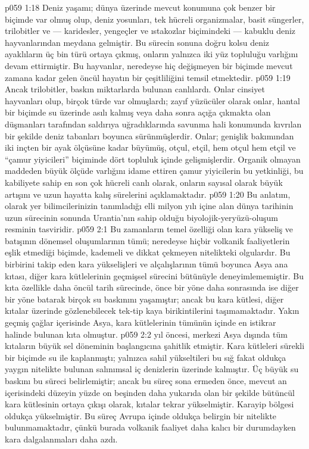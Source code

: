 \vs p059 1:18 Deniz yaşamı; dünya üzerinde mevcut konumuna çok benzer bir biçimde var olmuş olup, deniz yosunları, tek hücreli organizmalar, basit süngerler, trilobitler ve --- karidesler, yengeçler ve ıstakozlar biçimindeki --- kabuklu deniz hayvanlarından meydana gelmiştir. Bu sürecin sonuna doğru kolsu deniz ayaklıların üç bin türü ortaya çıkmış, onların yalnızca iki yüz topluluğu varlığını devam ettirmiştir. Bu hayvanlar, neredeyse hiç değişmeyen bir biçimde mevcut zamana kadar gelen öncül hayatın bir çeşitliliğini temsil etmektedir.
\vs p059 1:19 Ancak trilobitler, baskın miktarlarda bulunan canlılardı. Onlar cinsiyet hayvanları olup, birçok türde var olmuşlardı; zayıf yüzücüler olarak onlar, hantal bir biçimde su üzerinde asılı kalmış veya daha sonra açığa çıkmakta olan düşmanları tarafından saldırıya uğradıklarında savunma hali konumunda kıvrılan bir şekilde deniz tabanları boyunca sürünmüşlerdir. Onlar; genişlik bakımından iki inçten bir ayak ölçüsüne kadar büyümüş, otçul, etçil, hem otçul hem etçil ve “çamur yiyicileri” biçiminde dört topluluk içinde gelişmişlerdir. Organik olmayan maddeden büyük ölçüde varlığını idame ettiren çamur yiyicilerin bu yetkinliği, bu kabiliyete sahip en son çok hücreli canlı olarak, onların sayısal olarak büyük artışını ve uzun hayatta kalış sürelerini açıklamaktadır.
\vs p059 1:20 Bu anlatım,  olarak yer bilimcilerinizin tanımladığı elli milyon yılı içine alan dünya tarihinin uzun sürecinin sonunda Urantia’nın sahip olduğu biyolojik\hyp{}yeryüzü\hyp{}oluşum resminin tasviridir.
\vs p059 2:1 Bu zamanların temel özelliği olan kara yükseliş ve batışının dönemsel oluşumlarının tümü; neredeyse hiçbir volkanik faaliyetlerin eşlik etmediği biçimde, kademeli ve dikkat çekmeyen nitelikteki olgulardır. Bu birbirini takip eden kara yükselişleri ve alçalışlarının tümü boyunca Asya ana kıtası, diğer kara kütlelerinin geçmişsel sürecini bütünüyle deneyimlememiştir. Bu kıta özellikle daha öncül tarih sürecinde, önce bir yöne daha sonrasında ise diğer bir yöne batarak birçok su baskınını yaşamıştır; ancak bu kara kütlesi, diğer kıtalar üzerinde gözlenebilecek tek\hyp{}tip kaya birikintilerini taşımamaktadır. Yakın geçmiş çağlar içerisinde Asya, kara kütlelerinin tümünün içinde en istikrar halinde bulunan kıta olmuştur.
\vs p059 2:2  yıl öncesi, merkezi Asya dışında tüm kıtaların büyük sel döneminin başlangıcına şahitlik etmiştir. Kara kütleleri sürekli bir biçimde su ile kaplanmıştı; yalnızca sahil yükseltileri bu sığ fakat oldukça yaygın nitelikte bulunan salınımsal iç denizlerin üzerinde kalmıştır. Üç büyük su baskını bu süreci belirlemiştir; ancak bu süreç sona ermeden önce, mevcut an içerisindeki düzeyin yüzde on beşinden daha yukarıda olan bir şekilde bütüncül kara kütlesinin ortaya çıkışı olarak, kıtalar tekrar yükselmiştir. Karayip bölgesi oldukça yükselmiştir. Bu süreç Avrupa içinde oldukça belirgin bir nitelikte bulunmamaktadır, çünkü burada volkanik faaliyet daha kalıcı bir durumdayken kara dalgalanmaları daha azdı.
